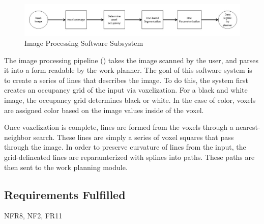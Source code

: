 \begin{figure}[h!]
 \centering
  \includegraphics[width=0.99\columnwidth]{diagrams/sw_arch_image_processing.jpg}
	\caption{Image Processing Software Subsystem}
 \label{fig:image_processing}
\end{figure}

The image processing pipeline () takes the image scanned by the user, and parses it into a form readable by the work planner. The goal of this software system is to create a series of lines that describes the image. To do this, the system first creates an occupancy grid of the input via voxelization. For a black and white image, the occupancy grid determines black or white. In the case of color, voxels are assigned color based on the image values inside of the voxel.

Once voxelization is complete, lines are formed from the voxels through a nearest-neighbor search. These lines are simply a series of voxel squares that pass through the image. In order to preserve curvature of lines from the input, the grid-delineated lines are reparamterized with splines into paths. These paths are then sent to the work planning module.

\subsection{Requirements Fulfilled}
\label{subsec:image_processing_req_fulfilled}
NFR8, NF2, FR11